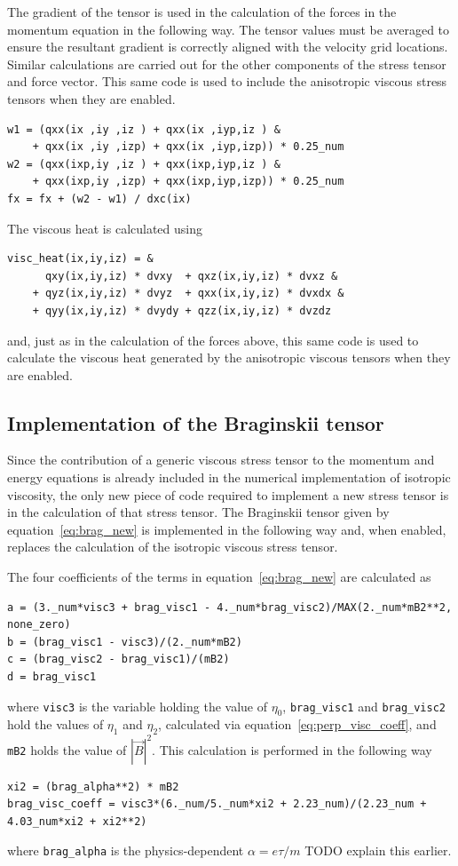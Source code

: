 The gradient of the tensor is used in the calculation of the forces in the momentum equation in the following way. The tensor values must be averaged to ensure the resultant gradient is correctly aligned with the velocity grid locations. Similar calculations are carried out for the other components of the stress tensor and force vector. This same code is used to include the anisotropic viscous stress tensors when they are enabled.
\begin{verbatim}
w1 = (qxx(ix ,iy ,iz ) + qxx(ix ,iyp,iz ) &
    + qxx(ix ,iy ,izp) + qxx(ix ,iyp,izp)) * 0.25_num
w2 = (qxx(ixp,iy ,iz ) + qxx(ixp,iyp,iz ) &
    + qxx(ixp,iy ,izp) + qxx(ixp,iyp,izp)) * 0.25_num
fx = fx + (w2 - w1) / dxc(ix)
\end{verbatim}

The viscous heat is calculated using
\begin{verbatim}
visc_heat(ix,iy,iz) = &
      qxy(ix,iy,iz) * dvxy  + qxz(ix,iy,iz) * dvxz &
    + qyz(ix,iy,iz) * dvyz  + qxx(ix,iy,iz) * dvxdx &
    + qyy(ix,iy,iz) * dvydy + qzz(ix,iy,iz) * dvzdz
\end{verbatim}
and, just as in the calculation of the forces above, this same code is used to calculate the viscous heat generated by the anisotropic viscous tensors when they are enabled.

\subsection{Implementation of the Braginskii tensor}

Since the contribution of a generic viscous stress tensor to the momentum and energy equations is already included in the numerical implementation of isotropic viscosity, the only new piece of code required to implement a new stress tensor is in the calculation of that stress tensor. The Braginskii tensor given by equation~\ref{eq:brag_new} is implemented in the following way and, when enabled, replaces the calculation of the isotropic viscous stress tensor. 

The four coefficients of the terms in equation~\ref{eq:brag_new} are calculated as
\begin{verbatim}
a = (3._num*visc3 + brag_visc1 - 4._num*brag_visc2)/MAX(2._num*mB2**2, none_zero)
b = (brag_visc1 - visc3)/(2._num*mB2)
c = (brag_visc2 - brag_visc1)/(mB2)
d = brag_visc1
\end{verbatim}
where \verb|visc3| is the variable holding the value of $\eta_0$, \verb|brag_visc1| and \verb|brag_visc2| hold the values of $\eta_1$ and $\eta_2$, calculated via equation~\ref{eq:perp_visc_coeff}, and \verb|mB2| holds the value of $|\vec{B}|^2$. This calculation is performed in the following way
\begin{verbatim}
xi2 = (brag_alpha**2) * mB2
brag_visc_coeff = visc3*(6._num/5._num*xi2 + 2.23_num)/(2.23_num + 4.03_num*xi2 + xi2**2)
\end{verbatim}
where \verb|brag_alpha| is the physics-dependent $\alpha = e \tau / m$ TODO explain this earlier.

